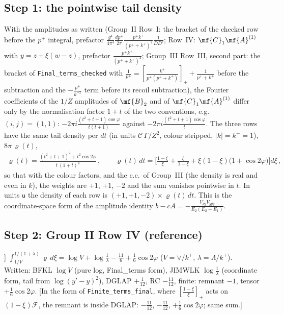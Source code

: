 \subsection{Step 1: the pointwise tail density}
\noindent [A, \texttt{t1}] With the amplitudes as written (Group~II Row~I: the bracket of the checked row before the $p^{+}$ integral, prefactor $\frac{g^{4}}{4\pi^{4}}\frac{dp^{+}}{2\pi}\frac{p^{+}k^{+}}{(p^{+}+k^{+})^{2}}\frac{1}{DD'}$; Row~IV: $\mf{C}_{1}\mf{A}^{(1)}$ with $y=z+\xi(w-z)$, prefactor $\frac{p^{+}k^{+}}{(p^{+}+k^{+})^{4}}$; Group~III Row~III, second part: the bracket of \texttt{Final\_terms\_checked} with $\frac{1}{p^{+}}=[\frac{k^{+}}{p^{+}(p^{+}+k^{+})}]_{+}+\frac{1}{p^{+}+k^{+}}$ before the subtraction and the $-\frac{p^{+}}{k^{+2}}$ term before its recoil subtraction), the Fourier coefficients of the $1/Z$ amplitudes of $\mf{B}_{2}$ and of $\mf{C}_{1}\mf{A}^{(1)}$ differ only by the normalisation factor $1+t$ of the two conventions, e.g.\ $(i,j)=(1,1)$: $-2\pi i\frac{(t^{2}+t+1)\cos\varphi}{t(t+1)}$ against $-2\pi i\frac{(t^{2}+t+1)\cos\varphi}{t}$. The three rows have the same tail density per $dt$ (in units $\mathcal{C}\,\Gamma/Z^{2}$, colour stripped, $|k|=k^{+}=1$), $8\pi\,\varrho(t)$,
\begin{align}
\varrho(t)=\frac{(t^{2}+t+1)^{2}+t^{2}\cos2\varphi}{t\,(1+t)^{4}}\,,\qquad \varrho(t)\,dt=\Big[\frac{1-\xi}{\xi}+\frac{\xi}{1-\xi}+\xi(1-\xi)\big(1+\cos2\varphi\big)\Big]d\xi\,,
\label{ft:rho}
\end{align}
so that with the colour factors, and the c.c.\ of Group~III (the density is real and even in $k$), the weights are $+1$, $+1$, $-2$ and the sum vanishes pointwise in $t$. In units $\mathsf{u}$ the density of each row is $(+1,+1,-2)\times\varrho(t)\,dt$. This is the coordinate-space form of the amplitude identity $b-cA=-\frac{V_{\rho g}V_{ggg}}{E_{2}(E_{2}-E_{1})}$.

\subsection{Step 2: Group II Row IV (reference)}
\noindent [A, \texttt{t3} [4]] $\int_{1/V}^{1/(1+\lambda)}\varrho\,d\xi=\log V+\log\frac1\lambda-\frac{11}{6}+\frac16\cos2\varphi$ ($V=\vee/k^{+}$, $\lambda=\Lambda/k^{+}$). Written: BFKL $\log V$ (pure log, Final\_terms form), JIMWLK $\log\frac1\lambda$ (coordinate form, tail from $\log(y'-y)^{2}$), DGLAP $+\frac1{12}$, RC $-\frac{11}{12}$, finite: remnant $-1$, tensor $+\frac16\cos2\varphi$. [In the form of \texttt{Finite\_terms\_final}, where $[\frac{1-\xi}{\xi}]_{+}$ acts on $(1-\xi)\mathcal{F}$, the remnant is inside DGLAP: $-\frac{11}{12}$, $-\frac{11}{12}$, $+\frac16\cos2\varphi$; same sum.]

